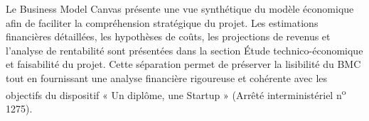 Le Business Model Canvas présente une vue synthétique du modèle économique afin de faciliter la compréhension stratégique du projet. Les estimations financières détaillées, les hypothèses de coûts, les projections de revenus et l'analyse de rentabilité sont présentées dans la section Étude technico-économique et faisabilité du projet. Cette séparation permet de préserver la lisibilité du BMC tout en fournissant une analyse financière rigoureuse et cohérente avec les objectifs du dispositif « Un diplôme, une Startup » (Arrêté interministériel n\textsuperscript{o} 1275).
